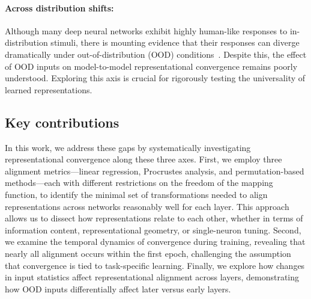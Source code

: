 \paragraph{Across distribution shifts:} Although many deep neural networks exhibit highly human-like responses to in-distribution stimuli, there is mounting evidence that their responses can diverge dramatically under out-of-distribution (OOD) conditions~\citep{prasad2022exploring, geirhos2021partial, geirhos2018generalisation}. Despite this, the effect of OOD inputs on model-to-model representational convergence remains poorly understood. Exploring this axis is crucial for rigorously testing the universality of learned representations.

\subsection*{Key contributions}  In this work, we address these gaps by systematically investigating representational convergence along these three axes. First, we employ three alignment metrics---linear regression, Procrustes analysis, and permutation-based methods---each with different restrictions on the freedom of the mapping function, to identify the minimal set of transformations needed to align representations across networks reasonably well for each layer. This approach allows us to dissect how representations relate to each other, whether in terms of information content, representational geometry, or single-neuron tuning. Second, we examine the temporal dynamics of convergence during training, revealing that nearly all alignment occurs within the first epoch, challenging the assumption that convergence is tied to task-specific learning. Finally, we explore how changes in input statistics affect representational alignment across layers, demonstrating how OOD inputs differentially affect later versus early layers.  






